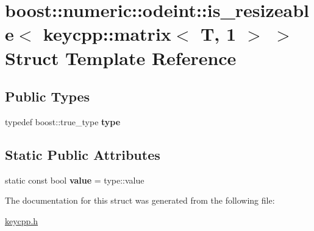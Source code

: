 \hypertarget{structboost_1_1numeric_1_1odeint_1_1is__resizeable_3_01keycpp_1_1matrix_3_01_t_00_011_01_4_01_4}{\section{boost\-:\-:numeric\-:\-:odeint\-:\-:is\-\_\-resizeable$<$ keycpp\-:\-:matrix$<$ T, 1 $>$ $>$ Struct Template Reference}
\label{structboost_1_1numeric_1_1odeint_1_1is__resizeable_3_01keycpp_1_1matrix_3_01_t_00_011_01_4_01_4}
}
\subsection*{Public Types}
\begin{DoxyCompactItemize}
\item 
\hypertarget{structboost_1_1numeric_1_1odeint_1_1is__resizeable_3_01keycpp_1_1matrix_3_01_t_00_011_01_4_01_4_ace451c5d393b2ed47e601eb300832efd}{typedef boost\-::true\-\_\-type {\bfseries type}}\label{structboost_1_1numeric_1_1odeint_1_1is__resizeable_3_01keycpp_1_1matrix_3_01_t_00_011_01_4_01_4_ace451c5d393b2ed47e601eb300832efd}

\end{DoxyCompactItemize}
\subsection*{Static Public Attributes}
\begin{DoxyCompactItemize}
\item 
\hypertarget{structboost_1_1numeric_1_1odeint_1_1is__resizeable_3_01keycpp_1_1matrix_3_01_t_00_011_01_4_01_4_a16be7ca492a014298d22fc88ba5b2b84}{static const bool {\bfseries value} = type\-::value}\label{structboost_1_1numeric_1_1odeint_1_1is__resizeable_3_01keycpp_1_1matrix_3_01_t_00_011_01_4_01_4_a16be7ca492a014298d22fc88ba5b2b84}

\end{DoxyCompactItemize}


The documentation for this struct was generated from the following file\-:\begin{DoxyCompactItemize}
\item 
\hyperlink{keycpp_8h}{keycpp.\-h}\end{DoxyCompactItemize}
